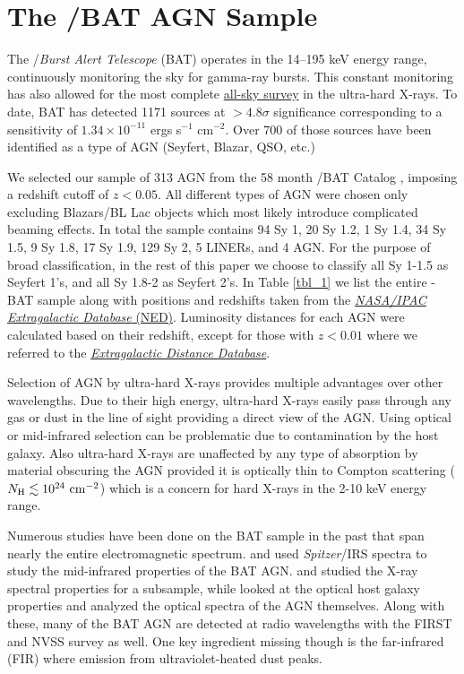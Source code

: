 \section{The \swift/BAT AGN Sample}\label{sample}
The  \swift/\textit{Burst Alert Telescope} (BAT) \cite{Barthelmy_2005,Gehrels_2004} operates in the 14--195 keV energy range, continuously monitoring the sky for gamma-ray bursts. This constant monitoring has also allowed for the most complete \href{https://swift.gsfc.nasa.gov/results/bs70mon/}{all-sky survey} in the ultra-hard X-rays. To date, BAT has detected 1171 sources at  $>4.8\sigma$ significance corresponding to a sensitivity of $1.34\times10^{-11}$ ergs s$^{-1}$ cm$^{-2}$. Over 700 of those sources have been identified as a type of AGN (Seyfert, Blazar, QSO, etc.)

We selected our sample of 313 AGN from the 58 month \swift/BAT Catalog \citep{Baumgartner:2012gf}, imposing a redshift cutoff of $z<0.05$. All different types of AGN were chosen only excluding Blazars/BL Lac objects which most likely introduce complicated beaming effects. In total the sample contains 94 Sy 1, 20 Sy 1.2, 1 Sy 1.4, 34 Sy 1.5, 9 Sy 1.8, 17 Sy 1.9, 129 Sy 2, 5 LINERs, and 4 AGN. For the purpose of broad classification, in the rest of this paper we choose to classify all Sy 1-1.5 as Seyfert 1's, and all Sy 1.8-2 as Seyfert 2's. In Table \ref{tbl_1} we list the entire \herschel{}-BAT sample along with positions and redshifts taken from the \href{http://ned.ipac.caltech.edu/}{\textit{NASA/IPAC Extragalactic Database} (NED)}. Luminosity distances for each AGN were calculated based on their redshift, except for those with $z < 0.01$ where we referred to the \href{http://edd.ifa.hawaii.edu/]}{\textit{Extragalactic Distance Database}}.

Selection of AGN by ultra-hard X-rays provides multiple advantages over other wavelengths. Due to their high energy, ultra-hard X-rays easily pass through any gas or dust in the line of sight providing a direct view of the AGN. Using optical or mid-infrared selection can be problematic due to contamination by the host galaxy. Also ultra-hard X-rays are unaffected by any type of absorption by material obscuring the AGN provided it is optically thin to Compton scattering ($N_{\rm{H}} \lesssim 10^{24}\,\, \rm{cm}^{-2}$) which is a concern for hard X-rays in the 2-10 keV energy range.

Numerous studies have been done on the BAT sample in the past that span nearly the entire electromagnetic spectrum. \citet{Weaver:2010rt} and \citet{Melendez:2008pd} used \textit{Spitzer}/IRS spectra to study the mid-infrared properties of the BAT AGN. \cite{Winter:2009kx} and \cite{Vasudevan:2013dz} studied the X-ray spectral properties for a subsample, while \citet{Koss:2011vn} looked at the optical host galaxy properties and \citep{Winter:2010yq} analyzed the optical spectra of the AGN themselves. Along with these, many of the BAT AGN are detected at radio wavelengths with the FIRST \citep{Becker:1995lq} and NVSS \citep{Condon:1998eu} survey as well. One key ingredient missing though is the far-infrared (FIR) where emission from ultraviolet-heated dust peaks.
  